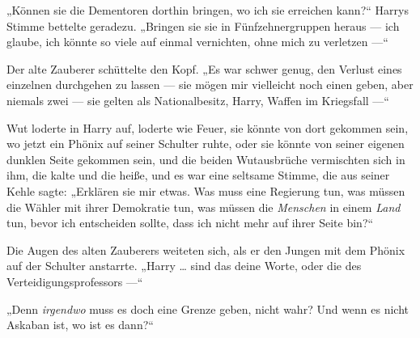„Können sie die Dementoren dorthin bringen, wo ich sie erreichen kann?“ Harrys Stimme bettelte geradezu.
„Bringen sie sie in Fünfzehnergruppen heraus — ich glaube, ich könnte so viele auf einmal vernichten, ohne mich zu verletzen —“

Der alte Zauberer schüttelte den Kopf.
„Es war schwer genug, den Verlust eines einzelnen durchgehen zu lassen — sie mögen mir vielleicht noch einen geben, aber niemals zwei — sie gelten als Nationalbesitz, Harry, Waffen im Kriegsfall —“

Wut loderte in Harry auf, loderte wie Feuer, sie könnte von dort gekommen sein, wo jetzt ein Phönix auf seiner Schulter ruhte, oder sie könnte von seiner eigenen dunklen Seite gekommen sein, und die beiden Wutausbrüche vermischten sich in ihm, die kalte und die heiße, und es war eine seltsame Stimme, die aus seiner Kehle sagte:
„Erklären sie mir etwas. Was muss eine Regierung tun, was müssen die Wähler mit ihrer Demokratie tun, was müssen die \emph{Menschen} in einem \emph{Land} tun, bevor ich entscheiden sollte, dass ich nicht mehr auf ihrer Seite bin?“

Die Augen des alten Zauberers weiteten sich, als er den Jungen mit dem Phönix auf der Schulter anstarrte.
„Harry … sind das deine Worte, oder die des Verteidigungsprofessors —“

„Denn \emph{irgendwo} muss es doch eine Grenze geben, nicht wahr? Und wenn es nicht Askaban ist, wo ist es dann?“

